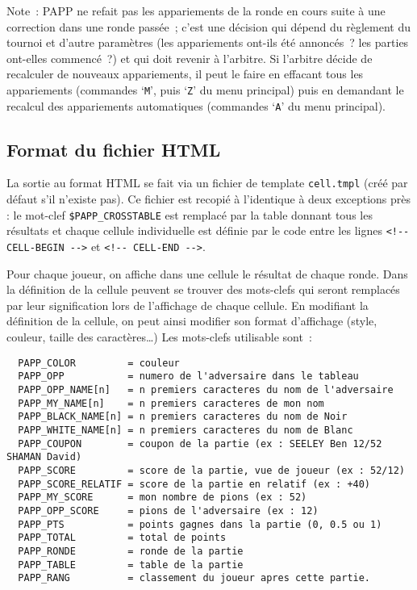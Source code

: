 \documentclass[10pt]{article}
\begin{document}
Note~: PAPP ne refait pas les appariements de la ronde en cours suite 
\`a une correction dans une ronde pass\'ee~; c'est une d\'ecision qui 
d\'epend du r\`eglement du tournoi et d'autre param\`etres (les 
appariements ont-ils \'et\'e annonc\'es~?  les parties ont-elles 
commenc\'e~?)  et qui doit revenir \`a l'arbitre.  Si l'arbitre 
d\'ecide de recalculer de nouveaux appariements, il peut le faire en 
effacant tous les appariements (commandes `\verb|M|', puis `\verb|Z|' 
du menu principal) puis en demandant le recalcul des appariements 
automatiques (commandes `\verb|A|' du menu principal).

\subsection{Format du fichier HTML}

La sortie au format HTML se fait via un fichier de template \verb|cell.tmpl|
(cr\'e\'e par d\'efaut s'il n'existe pas). Ce fichier est recopi\'e \`a l'identique
\`a deux exceptions pr\`es : le mot-clef \verb|$PAPP_CROSSTABLE| est remplac\'e
par la table donnant tous les r\'esultats et chaque cellule individuelle est d\'efinie
par le code entre les lignes \verb|<!-- CELL-BEGIN -->| et \verb|<!-- CELL-END -->|.

Pour chaque joueur, on affiche dans une cellule le r\'esultat
de chaque ronde. Dans la d\'efinition de la cellule peuvent se trouver
des mots-clefs qui seront remplac\'es
par leur signification lors de l'affichage de chaque cellule.
En modifiant la d\'efinition de la cellule, on peut ainsi  modifier son format d'affichage
(style, couleur, taille des caract\`eres\ldots)
Les mots-clefs utilisable sont~:
\begin{verbatim}
  PAPP_COLOR         = couleur
  PAPP_OPP           = numero de l'adversaire dans le tableau 
  PAPP_OPP_NAME[n]   = n premiers caracteres du nom de l'adversaire
  PAPP_MY_NAME[n]    = n premiers caracteres de mon nom
  PAPP_BLACK_NAME[n] = n premiers caracteres du nom de Noir
  PAPP_WHITE_NAME[n] = n premiers caracteres du nom de Blanc
  PAPP_COUPON        = coupon de la partie (ex : SEELEY Ben 12/52 SHAMAN David)
  PAPP_SCORE         = score de la partie, vue de joueur (ex : 52/12)
  PAPP_SCORE_RELATIF = score de la partie en relatif (ex : +40)
  PAPP_MY_SCORE      = mon nombre de pions (ex : 52)
  PAPP_OPP_SCORE     = pions de l'adversaire (ex : 12)
  PAPP_PTS           = points gagnes dans la partie (0, 0.5 ou 1) 
  PAPP_TOTAL         = total de points
  PAPP_RONDE         = ronde de la partie
  PAPP_TABLE         = table de la partie
  PAPP_RANG          = classement du joueur apres cette partie.
\end{verbatim}
\end{document}
